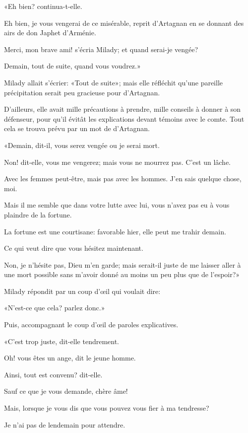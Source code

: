 «Eh bien? continua-t-elle. 

\speak  Eh bien, je vous vengerai de ce misérable, reprit d'Artagnan en se donnant des airs de don Japhet d'Arménie. 

\speak  Merci, mon brave ami! s'écria Milady; et quand serai-je vengée? 

\speak  Demain, tout de suite, quand vous voudrez.» 

Milady allait s'écrier: «Tout de suite»; mais elle réfléchit qu'une pareille précipitation serait peu gracieuse pour d'Artagnan. 

D'ailleurs, elle avait mille précautions à prendre, mille conseils à donner à son défenseur, pour qu'il évitât les explications devant témoins avec le comte. Tout cela se trouva prévu par un mot de d'Artagnan. 

«Demain, dit-il, vous serez vengée ou je serai mort. 

\speak  Non! dit-elle, vous me vengerez; mais vous ne mourrez pas. C'est un lâche. 

\speak  Avec les femmes peut-être, mais pas avec les hommes. J'en sais quelque chose, moi. 

\speak  Mais il me semble que dans votre lutte avec lui, vous n'avez pas eu à vous plaindre de la fortune. 

\speak  La fortune est une courtisane: favorable hier, elle peut me trahir demain. 

\speak  Ce qui veut dire que vous hésitez maintenant. 

\speak  Non, je n'hésite pas, Dieu m'en garde; mais serait-il juste de me laisser aller à une mort possible sans m'avoir donné au moins un peu plus que de l'espoir?» 

Milady répondit par un coup d'œil qui voulait dire: 

«N'est-ce que cela? parlez donc.» 

Puis, accompagnant le coup d'œil de paroles explicatives. 

«C'est trop juste, dit-elle tendrement. 

\speak  Oh! vous êtes un ange, dit le jeune homme. 

\speak  Ainsi, tout est convenu? dit-elle. 

\speak  Sauf ce que je vous demande, chère âme! 

\speak  Mais, lorsque je vous dis que vous pouvez vous fier à ma tendresse? 

\speak  Je n'ai pas de lendemain pour attendre. 

